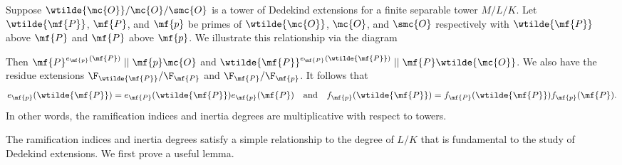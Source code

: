 \documentclass[12pt]{article}
\begin{document}
      Suppose \(\wtilde{\mc{O}}/\mc{O}/\smc{O}\) is a tower of Dedekind extensions for a finite separable tower \(M/L/K\). Let \(\wtilde{\mf{P}}\), \(\mf{P}\), and \(\mf{p}\) be primes of \(\wtilde{\mc{O}}\), \(\mc{O}\), and \(\smc{O}\) respectively with \(\wtilde{\mf{P}}\) above \(\mf{P}\) and \(\mf{P}\) above \(\mf{p}\). We illustrate this relationship via the diagram
      \begin{center}
      \end{center} 
      Then \(\mf{P}^{e_{\mf{p}}(\mf{P})} \mid\mid \mf{p}\mc{O}\) and \(\wtilde{\mf{P}}^{e_{\mf{P}}(\wtilde{\mf{P}})} \mid\mid \mf{P}\wtilde{\mc{O}}\). We also have the residue extensions \(\F_{\wtilde{\mf{P}}}/\F_{\mf{P}}\) and \(\F_{\mf{P}}/\F_{\mf{p}}\). It follows that
      \begin{equation}\label{equ:ramification_and_interia_towers}
        e_{\mf{p}}(\wtilde{\mf{P}}) = e_{\mf{P}}(\wtilde{\mf{P}})e_{\mf{p}}(\mf{P}) \quad \text{and} \quad f_{\mf{p}}(\wtilde{\mf{P}}) = f_{\mf{P}}(\wtilde{\mf{P}})f_{\mf{p}}(\mf{P}).
      \end{equation}
      In other words, the ramification indices and inertia degrees are multiplicative with respect to towers.

      The ramification indices and inertia degrees satisfy a simple relationship to the degree of \(L/K\) that is fundamental to the study of Dedekind extensions. We first prove a useful lemma.
\end{document}
